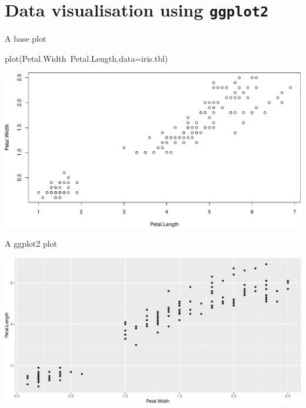 \documentclass[14pt,ignorenonframetext,]{bredelebeamer}
\newenvironment{Shaded}{\begin{snugshade}}{\end{snugshade}}
\newcommand{\KeywordTok}[1]{\textcolor[rgb]{0.94,0.87,0.69}{#1}}
\newcommand{\DataTypeTok}[1]{\textcolor[rgb]{0.87,0.87,0.75}{#1}}
\newcommand{\StringTok}[1]{\textcolor[rgb]{0.80,0.58,0.58}{#1}}
\newcommand{\OperatorTok}[1]{\textcolor[rgb]{0.94,0.94,0.82}{#1}}
\newcommand{\NormalTok}[1]{\textcolor[rgb]{0.80,0.80,0.80}{#1}}
\begin{document}
\section{\texorpdfstring{Data visualisation using
\texttt{ggplot2}}{Data visualisation using ggplot2}}\label{data-visualisation-using-ggplot2}

\begin{frame}[fragile]{A base plot}

\centering

\begin{Shaded}
\begin{Highlighting}[]
\KeywordTok{plot}\NormalTok{(Petal.Width}\OperatorTok{~}\NormalTok{Petal.Length,}\DataTypeTok{data=}\NormalTok{iris.tbl)}
\end{Highlighting}
\end{Shaded}

\includegraphics{tidyverse_28_03_files/figure-beamer/base_plot1-1.pdf}

\end{frame}

\begin{frame}[fragile]{A ggplot2 plot}

\centering

\begin{Shaded}
\end{Shaded}

\includegraphics{tidyverse_28_03_files/figure-beamer/ggplot1-1.pdf}

\end{frame}
\end{document}
